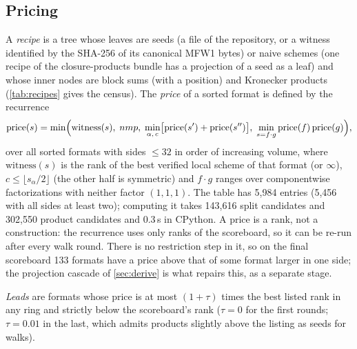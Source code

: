 \subsection{Pricing}
A \emph{recipe} is a tree whose leaves are seeds (a file of the repository, or a witness identified by the SHA-256 of its canonical MFW1 bytes) or naive schemes (one recipe of the closure-products bundle has a projection of a seed as a leaf) and whose inner nodes are block sums (with a position) and Kronecker products (\cref{tab:recipes}
gives the census). The \emph{price} of a sorted format is defined by the recurrence
\[
 \mathrm{price}(s)=\min\Bigl(\mathrm{witness}(s),\; nmp,\;\min_{\alpha,\,c}\bigl[\mathrm{price}(s')+\mathrm{price}(s'')\bigr],\;\min_{s=f\cdot g}\mathrm{price}(f)\,\mathrm{price}(g)\Bigr),
\]
over all sorted formats with sides $\le32$ in order of increasing volume, where $\mathrm{witness}(s)$ is the rank of the best verified local scheme of that format (or $\infty$), $c\le\lfloor s_\alpha/2\rfloor$ (the other half is symmetric) and $f\cdot g$ ranges over componentwise factorizations with neither factor $(1,1,1)$.
The table has 5{,}984 entries (5{,}456 with all sides at least two); computing it takes 143{,}616 split candidates and 302{,}550 product candidates and 0.3\,s in CPython.
A price is a rank, not a construction: the recurrence uses only ranks of the scoreboard, so it can be re-run after every walk round. There is no restriction step in it, so on the final scoreboard 133 formats have a price above that of some format larger in one side; the projection cascade of \cref{sec:derive} is what repairs this, as a separate stage.

\emph{Leads} are formats whose price is at most $(1+\tau)$ times the best listed rank in any ring and strictly below the scoreboard's rank ($\tau=0$ for the first rounds; $\tau=0.01$ in the last, which admits products slightly above the listing as seeds for walks).

